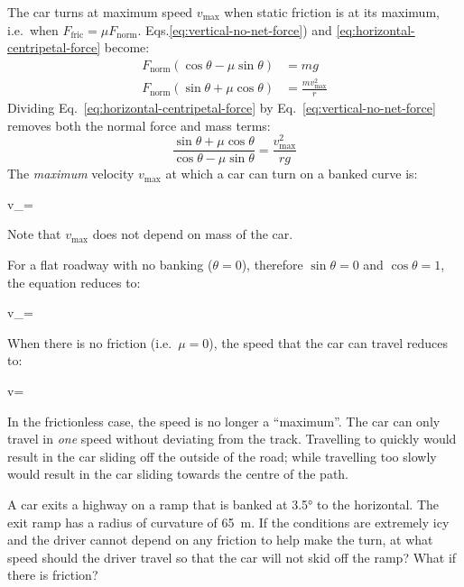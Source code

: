 The car turns at maximum speed $v_\text{max}$ when static friction is at its
maximum, i.e.\ when $F_\text{fric}=\mu F_\text{norm}$.
Eqs.\ref{eq:vertical-no-net-force}) and \ref{eq:horizontal-centripetal-force}
become:
\begin{align*}
  F_\text{norm}\left(\cos\theta-\mu\sin\theta\right) &=mg\\
  F_\text{norm}\left(\sin\theta+\mu\cos\theta\right) &=\frac{mv_\text{max}^2}r
\end{align*}
Dividing Eq.~\ref{eq:horizontal-centripetal-force} by
Eq.~\ref{eq:vertical-no-net-force} removes both the normal force and mass terms:
\begin{equation}
  \frac{\sin\theta+\mu\cos\theta}{\cos\theta-\mu\sin\theta}
  =\frac{v_\text{max}^2}{rg}
\end{equation}
The \emph{maximum} velocity $v_\text{max}$ at which a car can turn on a banked
curve is:
\begin{important-equation}
  \quad
  v_=
\end{important-equation}
Note that $v_\text{max}$ does not depend on mass of the car.

For a flat roadway with no banking ($\theta=0$), therefore $\sin\theta=0$ and
$\cos\theta=1$, the equation reduces to:
\begin{important-equation}
  \quad v_{}=
\end{important-equation}
When there is no friction (i.e.\ $\mu=0$), the speed that the car can travel
reduces to:
\begin{important-equation}
  \quad v=
\end{important-equation}
In the frictionless case, the speed is no longer a ``maximum''. The car can
only travel in \emph{one} speed without deviating from the track. Travelling to
quickly would result in the car sliding off the outside of the road; while
travelling too slowly would result in the car sliding towards the centre of
the path.

\begin{example}
  A car exits a highway on a ramp that is banked at \ang{3.5} to the horizontal.
  The exit ramp has a radius of curvature of \SI{65}{\metre}. If the conditions
  are extremely icy and the driver cannot depend on any friction to help make
  the turn, at what speed should the driver travel so that the car will not
  skid off the ramp? What if there is friction?
\end{example}



